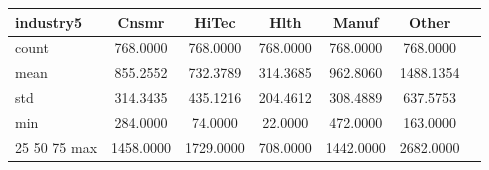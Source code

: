\begin{tabular}{lcccccc}
\toprule
industry5 & Cnsmr & HiTec & Hlth & Manuf & Other \\
\midrule
count & 768.0000 & 768.0000 & 768.0000 & 768.0000 & 768.0000 \\
mean & 855.2552 & 732.3789 & 314.3685 & 962.8060 & 1488.1354 \\
std & 314.3435 & 435.1216 & 204.4612 & 308.4889 & 637.5753 \\
min & 284.0000 & 74.0000 & 22.0000 & 472.0000 & 163.0000 \\
25%
50%
75%
max & 1458.0000 & 1729.0000 & 708.0000 & 1442.0000 & 2682.0000 \\
\bottomrule
\end{tabular}
